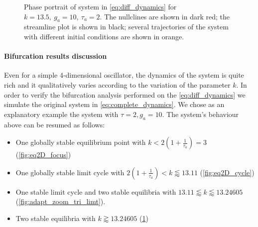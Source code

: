 \begin{figure}[!h]
        \caption{\label{fig:eq2D_cycle_after_collapse} Phase portrait of system in \eqref{eq:diff_dynamics} for $k=13.5,\ g_a=10,\ \tau_a=2$. The nullclines are shown in dark red; the streamline plot is shown in black; several trajectories of the system with different initial conditions are shown in orange. }
\end{figure}

\paragraph{Bifurcation results discussion}
Even for a simple 4-dimensional oscillator, the dynamics of the system is quite rich and it qualitatively varies according to the variation of the parameter $k$. In order to verify the bifurcation analysis performed on the \cref{eq:diff_dynamics} we simulate the original system in \cref{eq:complete_dynamics}.
We chose as an explanatory example the system with $\tau=2, g_a=10$. The system's behaviour above can be resumed as follows:
\begin{itemize}
    \item One globally stable equilibrium point with $k<2(1+\frac{1}{\tau_a})=3$ (\cref{fig:eq2D_focus})
    \item One globally stable limit cycle with $2(1+\frac{1}{\tau_a}) < k \lessapprox 13.11$ (\cref{fig:eq2D_cycle})
    \item One stable limit cycle and two stable equilibria with $13.11 \lessapprox k \lessapprox 13.24605$ (\cref{fig:adapt_zoom_tri_limt}). 
    \item Two stable equilibria with $k \gtrapprox 13.24605$ (\cref{fig:eq2D_cycle_after_collapse})
\end{itemize}
